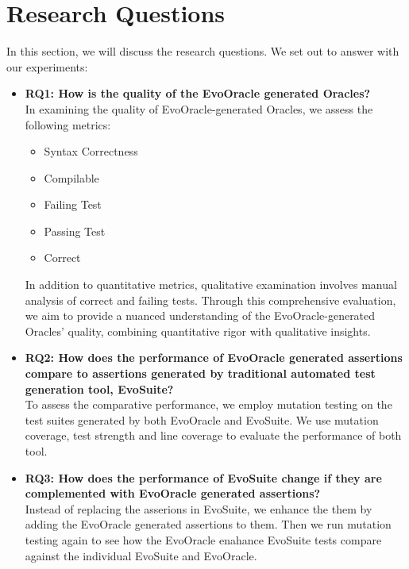 \section{Research Questions}
\label{sec:research_questions}
\vspace{0.2 cm}

In this section, we will discuss the research questions. We set out to answer with our experiments:
\begin{itemize}
    \item \textbf{RQ1: How is the quality of the EvoOracle generated Oracles?}\\
    In examining the quality of EvoOracle-generated Oracles, we assess the following metrics:
    \begin{itemize}
        \item Syntax Correctness
        \item Compilable
        \item Failing Test
        \item Passing Test
        \item Correct
    \end{itemize}
    In addition to quantitative metrics, qualitative examination involves manual analysis of correct and failing tests. Through this comprehensive evaluation, we aim to provide a nuanced understanding of the EvoOracle-generated Oracles' quality, combining quantitative rigor with qualitative insights.
    
    \item \textbf{RQ2: How does the performance of EvoOracle generated assertions compare to assertions generated by traditional automated test generation tool, EvoSuite?}\\
    To assess the comparative performance, we employ mutation testing on the test suites generated by both EvoOracle and EvoSuite. We use mutation coverage, test strength and line coverage to evaluate the performance of both tool.
    
    \item \textbf{RQ3: How does the performance of EvoSuite change if they are complemented with EvoOracle generated assertions?}\\
    Instead of replacing the asserions in EvoSuite, we enhance the them by adding the EvoOracle generated assertions to them. Then we run mutation testing again to see how the EvoOracle enahance EvoSuite tests compare against the individual EvoSuite and EvoOracle.
    

\end{itemize}
